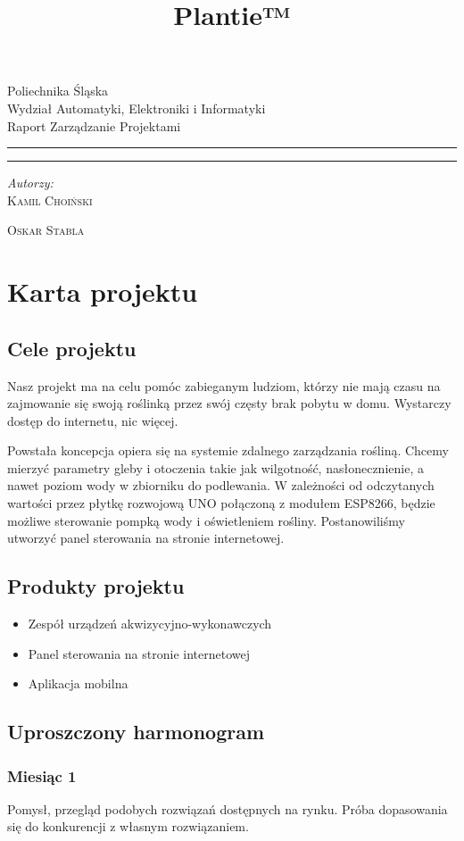 \documentclass[12pt]{article}
\title{Plantie™}
\makeatletter
\newcommand{\linia}{\rule{\linewidth}{0.4mm}}
\renewcommand{\maketitle}{\begin{titlepage}
		\vspace*{1cm}
		\begin{center}\small
			Poliechnika Śląska\\
			Wydział Automatyki, Elektroniki i Informatyki\\
			Raport Zarządzanie Projektami
		\end{center}
		\vspace{3cm}
		\noindent\linia
		\begin{center}
			\LARGE \textsc{\@title}
		\end{center}
		\linia
		\vspace{0.5cm}
		\begin{flushright}
			\begin{minipage}{15cm}
				\textit{\small Autorzy:}\\
				\normalsize \textsc{Kamil Choiński} \par \textsc{Oskar Stabla} \par
			\end{minipage}	
		\end{flushright}
		\vspace*{\stretch{6}}
		\begin{center}
			\@date
		\end{center}
	\end{titlepage}
}
\makeatother
\begin{document}
	
\maketitle

\tableofcontents

\newpage

\section{Karta projektu}


\subsection{Cele projektu}
Nasz projekt ma na celu pomóc zabieganym ludziom, którzy nie mają czasu na zajmowanie się
swoją roślinką przez swój częsty brak pobytu w domu. Wystarczy dostęp do internetu,
nic więcej.

Powstała koncepcja opiera się na systemie zdalnego zarządzania rośliną. Chcemy mierzyć parametry
gleby i otoczenia takie jak wilgotność, nasłonecznienie, a nawet poziom wody w zbiorniku do podlewania. W zależności od odczytanych wartości przez
płytkę rozwojową UNO połączoną z modułem ESP8266, będzie możliwe sterowanie pompką wody i oświetleniem rośliny. Postanowiliśmy utworzyć panel sterowania na stronie
internetowej.

\subsection{Produkty projektu}



\begin{itemize}
	\item Zespół urządzeń akwizycyjno-wykonawczych  
	\item Panel sterowania na stronie internetowej 
	\item Aplikacja mobilna 
\end{itemize}

\subsection{Uproszczony harmonogram}


\subsubsection{Miesiąc 1}
Pomysł, przegląd podobych rozwiązań dostępnych na rynku.
Próba dopasowania się do konkurencji z własnym rozwiązaniem.
\end{document}
